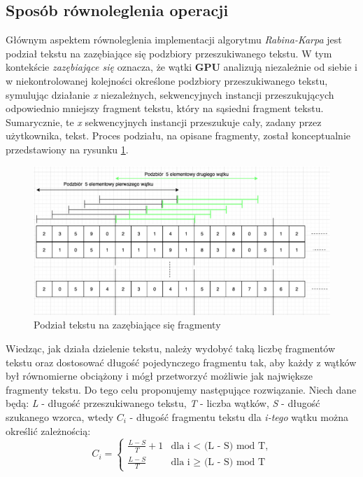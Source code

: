 \subsection{Sposób równoleglenia operacji}
\label{subsec:parallelism}
Głównym aspektem równoleglenia implementacji algorytmu \textit{Rabina-Karpa} jest podział tekstu na zazębiające się podzbiory przeszukiwanego tekstu. W tym kontekście \textit{zazębiające się} oznacza, że wątki \textbf{GPU} analizują niezależnie od siebie i w niekontrolowanej kolejności określone podzbiory przeszukiwanego tekstu, symulując działanie \textit{x} niezależnych, sekwencyjnych instancji przeszukujących odpowiednio mniejszy fragment tekstu, który  na sąsiedni fragment tekstu. Sumarycznie, te \textit{x} sekwencyjnych instancji przeszukuje cały, zadany przez użytkownika, tekst. Proces podziału, na opisane fragmenty, został konceptualnie przedstawiony na rysunku \ref{fig:text_splitting}.
\begin{figure}[H]
    \centering
    \includegraphics[width=\linewidth]{images/TextSplitting.png}
    \caption{Podział tekstu na zazębiające się fragmenty}
    \label{fig:text_splitting}
\end{figure}
Wiedząc, jak działa dzielenie tekstu, należy wydobyć taką liczbę fragmentów tekstu oraz dostosować długość pojedynczego fragmentu tak, aby każdy z wątków był równomierne obciążony i mógł przetworzyć możliwie jak największe fragmenty tekstu. Do tego celu proponujemy następujące rozwiązanie. 
\newpage
Niech dane będą: \textit{L} - długość przeszukiwanego tekstu, \textit{T} - liczba wątków, \textit{S} - długość szukanego wzorca, wtedy \textit{$C_i$} - długość fragmentu tekstu dla \textit{i-tego} wątku można określić zależnością:
\[
C_{i} = \begin{cases}
    \frac{L-S}{T} + 1& \text{dla i < (L - S) mod T}, \\
    \frac{L-S}{T}& \text{dla i $\geq$ (L - S) mod T}
\end{cases}
\]
